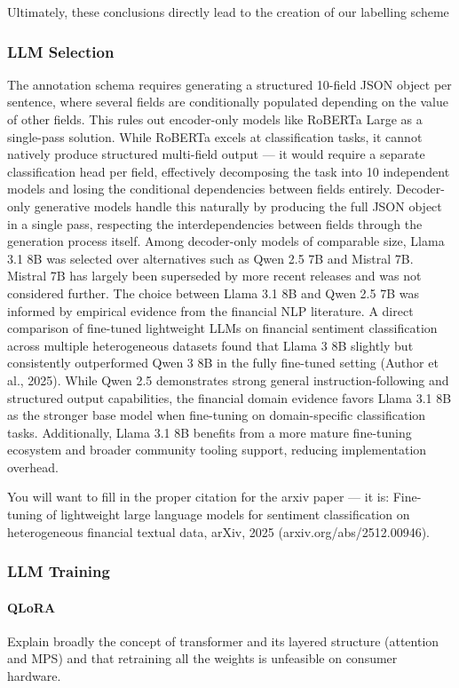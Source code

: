 \documentclass[11pt]{article}
\begin{document}
Ultimately, these conclusions directly lead to the creation of our labelling scheme




\subsubsection{LLM Selection}
The annotation schema requires generating a structured 10-field JSON object per sentence, where several fields are conditionally populated depending on the value of other fields. This rules out encoder-only models like RoBERTa Large as a single-pass solution. While RoBERTa excels at classification tasks, it cannot natively produce structured multi-field output — it would require a separate classification head per field, effectively decomposing the task into 10 independent models and losing the conditional dependencies between fields entirely. Decoder-only generative models handle this naturally by producing the full JSON object in a single pass, respecting the interdependencies between fields through the generation process itself.
Among decoder-only models of comparable size, Llama 3.1 8B was selected over alternatives such as Qwen 2.5 7B and Mistral 7B. Mistral 7B has largely been superseded by more recent releases and was not considered further. The choice between Llama 3.1 8B and Qwen 2.5 7B was informed by empirical evidence from the financial NLP literature. A direct comparison of fine-tuned lightweight LLMs on financial sentiment classification across multiple heterogeneous datasets found that Llama 3 8B slightly but consistently outperformed Qwen 3 8B in the fully fine-tuned setting (Author et al., 2025). While Qwen 2.5 demonstrates strong general instruction-following and structured output capabilities, the financial domain evidence favors Llama 3.1 8B as the stronger base model when fine-tuning on domain-specific classification tasks. Additionally, Llama 3.1 8B benefits from a more mature fine-tuning ecosystem and broader community tooling support, reducing implementation overhead.

You will want to fill in the proper citation for the arxiv paper — it is: Fine-tuning of lightweight large language models for sentiment classification on heterogeneous financial textual data, arXiv, 2025 (arxiv.org/abs/2512.00946).

\subsubsection{LLM Training}
\paragraph{QLoRA} 
Explain broadly the concept of transformer and its layered structure (attention and MPS) and that retraining all the weights is unfeasible on consumer hardware.
\end{document}
